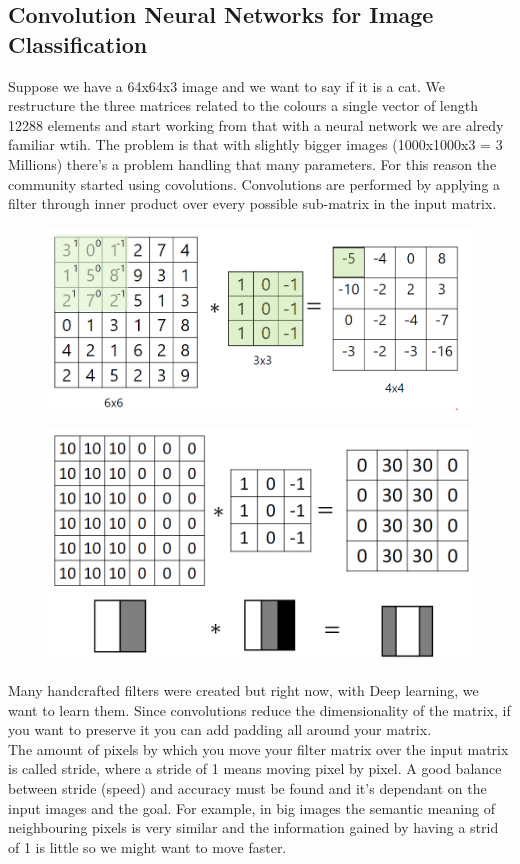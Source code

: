 \documentclass{article}
\begin{document}
\subsection{Convolution Neural Networks for Image Classification}
Suppose we have a 64x64x3 image and we want to say if it is a cat. We restructure the three matrices related to the colours a single vector of length 12288 elements and start working from that with a neural network we are alredy familiar wtih. The problem is that with slightly bigger images (1000x1000x3 = 3 Millions) there's a problem handling that many parameters. For this reason the community started using covolutions. Convolutions are performed by applying a filter through inner product over every possible sub-matrix in the input matrix. 
\begin{figure}[htbp]
    \centering
    \includegraphics[width=12cm]{convolution_example.png}
\end{figure}
\begin{figure}[htbp]
    \centering
    \includegraphics[width=12cm]{vertical_edge_example.png}
\end{figure}
Many handcrafted filters were created but right now, with Deep learning, we want to learn them. Since convolutions reduce the dimensionality of the matrix, if you want to preserve it you can add padding all around your matrix.\\
The amount of pixels by which you move your filter matrix over the input matrix is called stride, where a stride of 1 means moving pixel by pixel. A good balance between stride (speed) and accuracy must be found and it's dependant on the input images and the goal. For example, in big images the semantic meaning of neighbouring pixels is very similar and the information gained by having a strid of 1 is little so we might want to move faster.
\end{document}
